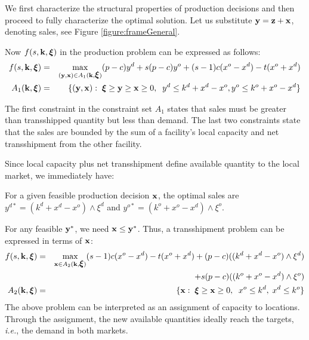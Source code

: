 \documentclass[mnsc,nonblindrev,copyedit]{informs2_wz} %
\newcommand{\xiv}{\mbox{\boldmath$\xi$}}
\begin{document}
We first characterize the structural properties of production decisions and then proceed to fully characterize the optimal solution.  Let us substitute $\bold y = \bold z+ \bold x$, denoting sales, see Figure \ref{figure:frameGeneral}.

Now $f(s,\bold{k},\xiv)$ in{ the production problem} can be
expressed as follows:
\begin{eqnarray}
    f(s,\bold {k},\xiv) &=& \max_{(\bold{y,x}) \in A_1(\bold{k},\xiv)} (p-c)y^d + s(p-c)y^o + (s-1)c(x^o -x^d) %
    -t(x^o + x^d) \label{eqn:fSales}\\
    A_1(\bold{k},\xiv) &=& \{(\bold{y,x}):\; \xiv \geq \bold y \geq \bold x \geq 0, \; \; y^d \leq k^d+x^d -x^o, y^o \leq k^o+x^o-x^d\} \label{eqn:A1}
\end{eqnarray}

The first constraint in the constraint set $A_1$ states that sales must be greater than transshipped quantity but less than demand.  The last two constraints state that the sales are bounded by the sum of a facility's local capacity and net transshipment from the other facility.

Since local capacity plus net transshipment define available quantity to the local market, we immediately have:


{\lemma For a given feasible production decision $\bold x$, the optimal sales are $y^{d*} =(k^d + x^d-x^o)\wedge \xi^d$ and $y^{o*} = (k^o+x^o-x^d)\wedge \xi^o$.
\label{lemma:baseSales}}

For any feasible $\bold y^*$, we need $\bold x \leq \bold y^*$.  Thus, a transshipment problem can be expressed in terms of $\bold x$:
\begin{eqnarray}
    f(s,\bold {k},\xiv) &=& \max_{\bold{x} \in A_2(\bold{k},\xiv)} (s-1)c(x^o -x^d)-t(x^o + x^d)+ (p-c)((k^d + x^d-x^o)\wedge \xi^d) \nonumber\\
    && + s(p-c)((k^o+x^o-x^d)\wedge \xi^o)  \label{eqn:transship}\\
     A_2(\bold{k},\xiv) &=& \{\bold{x}:\;  \xiv \geq \bold x \geq 0, \;\; x^o  \leq k^d,\; x^d \leq k^o\} \label{eqn:A2}
\end{eqnarray}
The above problem can be interpreted as an assignment of capacity to locations.  Through the assignment, the new available quantities ideally reach the targets, {\it i.e.}, the demand in both markets.
\end{document}
